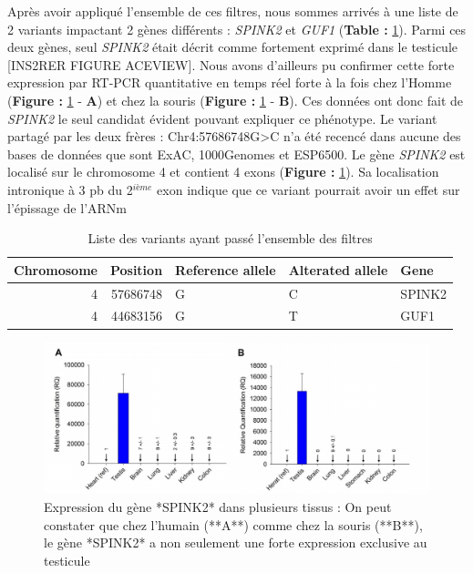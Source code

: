 \documentclass[12pt,twoside]{reedthesis}
\theoremstyle{definition}
\theoremstyle{definition}
\theoremstyle{remark}
\begin{document}
  Après avoir appliqué l'ensemble de ces filtres, nous sommes arrivés à
  une liste de 2 variants impactant 2 gènes différents : \emph{SPINK2} et
  \emph{GUF1} (\textbf{Table : }\ref{tab:passingfiltervar}). Parmi ces
  deux gènes, seul \emph{SPINK2} était décrit comme fortement exprimé dans
  le testicule {[}INS2RER FIGURE ACEVIEW{]}. Nous avons d'ailleurs pu
  confirmer cette forte expression par RT-PCR quantitative en temps réel
  forte à la fois chez l'Homme (\textbf{Figure : }\ref{fig:spink2exp} -
  \textbf{A}) et chez la souris (\textbf{Figure : }\ref{fig:spink2exp} -
  \textbf{B}). Ces données ont donc fait de \emph{SPINK2} le seul candidat
  évident pouvant expliquer ce phénotype. Le variant partagé par les deux
  frères : Chr4:57686748G\textgreater{}C n'a été recencé dans aucune des
  bases de données que sont ExAC, 1000Genomes et ESP6500. Le gène
  \emph{SPINK2} est localisé sur le chromosome 4 et contient 4 exons
  (\textbf{Figure : }\ref{fig:spink2exp}). Sa localisation intronique à 3
  pb du 2\(^{ième}\) exon indique que ce variant pourrait avoir un effet
  sur l'épissage de l'ARNm
  
  \begin{table}
  
  \caption{\label{tab:passingfiltervar}Liste des variants ayant passé l'ensemble des filtres}
  \centering
  \begin{tabular}[t]{r|r|l|l|l}
  \hline
  Chromosome & Position & Reference allele & Alterated allele & Gene\\
  \hline
  4 & 57686748 & G & C & SPINK2\\
  \hline
  4 & 44683156 & G & T & GUF1\\
  \hline
  \end{tabular}
  \end{table}
  
  \begin{figure}
  
  {\centering \includegraphics[scale=0.42]{figure/spink2_expression} 
  
  }
  
  \caption[Expression du gène *SPINK2* dans plusieurs tissus]{Expression du gène *SPINK2* dans plusieurs tissus : On peut constater que chez l'humain (**A**) comme chez la souris (**B**), le gène *SPINK2* a non seulement une forte expression exclusive au testicule}\label{fig:spink2exp}
  \end{figure}
  
\end{document}
